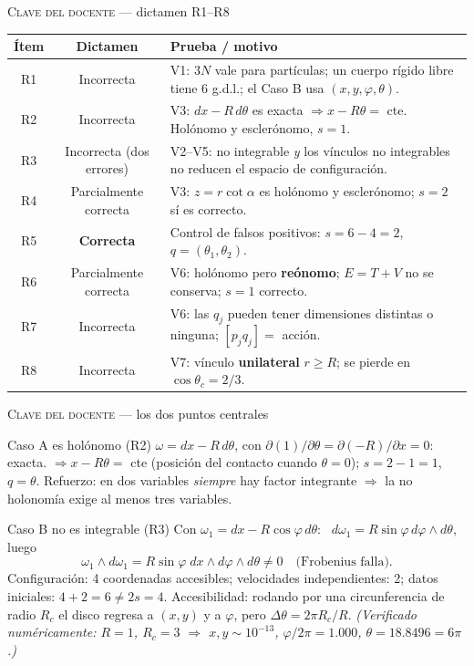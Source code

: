 \documentclass[10pt,aspectratio=169]{beamer}
\begin{document}
\begin{frame}{\textsc{Clave del docente} --- dictamen R1--R8}
  \small
  \begin{table}
  \begin{tabular}{@{}ccp{8.6cm}@{}}
    \toprule
    \textbf{Ítem} & \textbf{Dictamen} & \textbf{Prueba / motivo} \\
    \midrule
    R1 & Incorrecta & V1: $3N$ vale para partículas; un cuerpo rígido libre tiene 6 g.d.l.; el Caso B usa $(x,y,\varphi,\theta)$. \\
    R2 & \alert{Incorrecta} & V3: $dx-R\,d\theta$ es exacta $\Rightarrow x-R\theta=$ cte. Holónomo y esclerónomo, $s=1$. \\
    R3 & Incorrecta (dos errores) & V2--V5: no integrable \emph{y} los vínculos no integrables no reducen el espacio de configuración. \\
    R4 & Parcialmente correcta & V3: $z=r\cot\alpha$ es holónomo y esclerónomo; $s=2$ sí es correcto. \\
    R5 & \textbf{Correcta} & Control de falsos positivos: $s=6-4=2$, $q=(\theta_1,\theta_2)$. \\
    R6 & Parcialmente correcta & V6: holónomo pero \textbf{reónomo}; $E=T+V$ no se conserva; $s=1$ correcto. \\
    R7 & Incorrecta & V6: las $q_j$ pueden tener dimensiones distintas o ninguna; $[p_jq_j]=$ acción. \\
    R8 & Incorrecta & V7: vínculo \textbf{unilateral} $r\ge R$; se pierde en $\cos\theta_c=2/3$. \\
    \bottomrule
  \end{tabular}
  \end{table}
\end{frame}

\begin{frame}{\textsc{Clave del docente} --- los dos puntos centrales}
  \small
  \begin{block}{Caso A es holónomo (R2)}
    $\omega = dx - R\,d\theta$, con $\partial(1)/\partial\theta = \partial(-R)/\partial x = 0$: exacta.
    $\Rightarrow x-R\theta=$ cte (posición del contacto cuando $\theta=0$); $s = 2-1 = 1$, $q=\theta$.
    Refuerzo: en dos variables \emph{siempre} hay factor integrante $\Rightarrow$ la no holonomía exige al menos tres variables.
  \end{block}
  \begin{block}{Caso B no es integrable (R3)}
    Con $\omega_1 = dx - R\cos\varphi\,d\theta$: \ $d\omega_1 = R\sin\varphi\,d\varphi\wedge d\theta$, luego
    \[\omega_1\wedge d\omega_1 = R\sin\varphi\;dx\wedge d\varphi\wedge d\theta \neq 0 \quad\text{(Frobenius falla).}\]
    Configuración: 4 coordenadas accesibles; velocidades independientes: 2; datos iniciales: $4+2=6 \neq 2s=4$.
    Accesibilidad: rodando por una circunferencia de radio $R_c$ el disco regresa a $(x,y)$ y a $\varphi$, pero $\Delta\theta = 2\pi R_c/R$.
    \emph{(Verificado numéricamente: $R=1$, $R_c=3$ $\Rightarrow$ $x,y\sim10^{-13}$, $\varphi/2\pi = 1.000$, $\theta = 18.8496 = 6\pi$.)}
  \end{block}
\end{frame}
\end{document}
